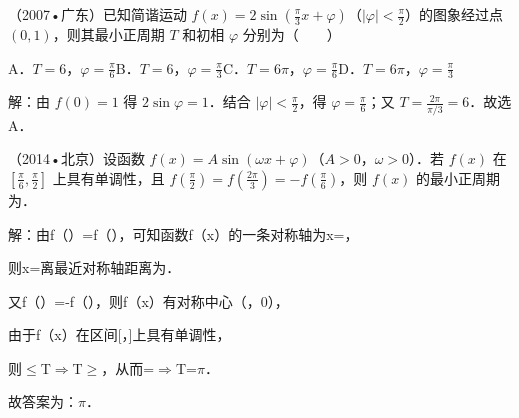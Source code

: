 \begin{question}
（2007•广东）已知简谐运动 $f(x)=2\sin(\frac{\pi}{3}x+\varphi)$（$|\varphi|<\frac{\pi}{2}$）的图象经过点 $(0,1)$，则其最小正周期 $T$ 和初相 $\varphi$ 分别为（　　）\par
A．$T=6$，$\varphi=\frac{\pi}{6}$\qquad B．$T=6$，$\varphi=\frac{\pi}{3}$\qquad C．$T=6\pi$，$\varphi=\frac{\pi}{6}$\qquad D．$T=6\pi$，$\varphi=\frac{\pi}{3}$\par
\begin{solution}
解：由 $f(0)=1$ 得 $2\sin\varphi=1$．结合 $|\varphi|<\frac{\pi}{2}$，得 $\varphi=\frac{\pi}{6}$；又 $T=\frac{2\pi}{\pi/3}=6$．故选 A．\par
\end{solution}
\end{question}

\begin{question}
（2014•北京）设函数 $f(x)=A\sin(\omega x+\varphi)$（$A>0$，$\omega>0$）．若 $f(x)$ 在 $[\frac{\pi}{6},\frac{\pi}{2}]$ 上具有单调性，且 $f(\frac{\pi}{2})=f(\frac{2\pi}{3})=-f(\frac{\pi}{6})$，则 $f(x)$ 的最小正周期为\AnswerBlank{\ensuremath{\pi}}．\par
\begin{solution}
解：由f（）=f（），可知函数f（x）的一条对称轴为x=，\par
则x=离最近对称轴距离为．\par
又f（）=-f（），则f（x）有对称中心（，0），\par
由于f（x）在区间[，]上具有单调性，\par
则\ensuremath{\le}T\ensuremath{\Longrightarrow}T\ensuremath{\ge}，从而=\ensuremath{\Longrightarrow}T=\ensuremath{\pi}．\par
故答案为：\ensuremath{\pi}．\par
\end{solution}
\end{question}

